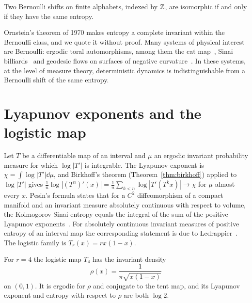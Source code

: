 \begin{theorem}
\label{thm:ornstein_isomorphism}
Two Bernoulli shifts on finite alphabets, indexed by $\mathbb{Z}$, are isomorphic if and only if they have the same entropy.
\end{theorem}

Ornstein's theorem of 1970 makes entropy a complete invariant within the Bernoulli class, and we quote it without proof. Many systems of physical interest are Bernoulli: ergodic toral automorphisms, among them the cat map~\cite{katznelson1971}, Sinai billiards~\cite{gallavottiornstein1974} and geodesic flows on surfaces of negative curvature~\cite{ornsteinweiss1973}. In these systems, at the level of measure theory, deterministic dynamics is indistinguishable from a Bernoulli shift of the same entropy.

\section{Lyapunov exponents and the logistic map}\label{sec:lyapunov_logistic}

Let $T$ be a differentiable map of an interval and $\mu$ an ergodic invariant probability measure for which $\log|T'|$ is integrable. The Lyapunov exponent is $\chi = \int\log|T'|\dd\mu$, and Birkhoff's theorem (Theorem~\ref{thm:birkhoff}) applied to $\log|T'|$ gives $\frac1n\log|(T^n)'(x)| = \frac1n\sum_{k<n}\log|T'(T^kx)|\to\chi$ for $\mu$ almost every $x$. Pesin's formula states that for a $C^2$ diffeomorphism of a compact manifold and an invariant measure absolutely continuous with respect to volume, the Kolmogorov Sinai entropy equals the integral of the sum of the positive Lyapunov exponents~\cite{pesin1977}. For absolutely continuous invariant measures of positive entropy of an interval map the corresponding statement is due to Ledrappier~\cite{ledrappier1981}. The logistic family is $T_r(x) = rx(1-x)$.

\begin{proposition}
\label{prop:logistic_r4}
For $r = 4$ the logistic map $T_4$ has the invariant density
\[
\rho(x) = \frac{1}{\pi\sqrt{x(1-x)}}
\]
on $(0,1)$. It is ergodic for $\rho$ and conjugate to the tent map, and its Lyapunov exponent and entropy with respect to $\rho$ are both $\log2$.
\end{proposition}

